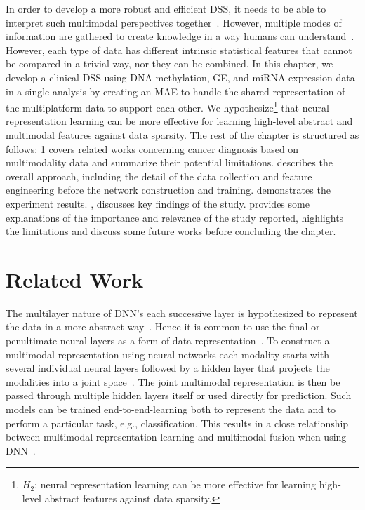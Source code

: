 \hspace*{3.5mm} In order to develop a more robust and efficient DSS, it needs to be able to interpret such multimodal perspectives together~\cite{mmsurvey}. However, multiple modes of information are gathered to create knowledge in a way humans can understand~\cite{mmdcae}. However, each type of data has different intrinsic statistical features that cannot be compared in a trivial way, nor they can be combined. In this chapter, we develop a clinical DSS using DNA methylation, GE, and miRNA expression data in a single analysis by creating an MAE to handle the shared representation of the multiplatform data to support each other. We hypothesize\footnote{    \textbf{$H_2$}: neural representation learning can be more effective for learning high-level abstract features against data sparsity.} that neural representation learning can be more effective for learning high-level abstract and multimodal features against data sparsity. 
The rest of the chapter is structured as follows: \cref{chapter_4:rw} covers related works concerning cancer diagnosis based on multimodality data and summarize their potential limitations.  describes the overall approach, including the detail of the data collection and feature engineering before the network construction and training.  demonstrates the experiment results. , discusses key findings of the study.  provides some explanations of the importance and relevance of the study reported, highlights the limitations and discuss some future works before concluding the chapter. 

\section{Related Work}\label{chapter_4:rw}
The multilayer nature of DNN's each successive layer is hypothesized to represent the data in a more abstract way~\cite{mmsurvey}. Hence it is common to use the final or penultimate neural layers as a form of data representation~\cite{mmsurvey,serban2016multi}. To construct a multimodal representation using neural networks each modality starts with several individual neural layers followed by a hidden layer that projects the modalities into a joint space~\cite{serban2016multi}. The joint multimodal representation is then be passed through multiple hidden layers itself or used directly for prediction. Such models can be trained end-to-end-learning both to represent the data and to perform a particular task, e.g., classification. This results in a close relationship between multimodal representation learning and multimodal fusion when using DNN~\cite{wang2018associativemulti}.

